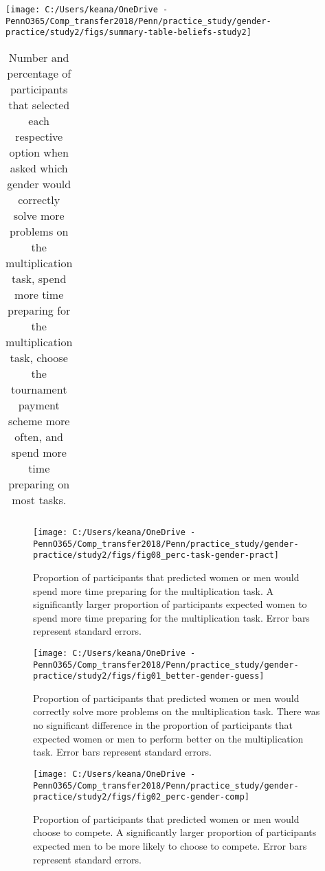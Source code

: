 \documentclass[letterpaper, nobind]{templates/ociamthesis}
\begin{document}
\begin{center}\texttt{[image: C:/Users/keana/OneDrive - PennO365/Comp\_transfer2018/Penn/practice\_study/gender-practice/study2/figs/summary-table-beliefs-study2]} \end{center}

\begin{table}[ht]
\centering
\begingroup\fontsize{0.1pt}{0.1pt}\selectfont
\begin{tabular}{r}
   \\ 
 \end{tabular}
\endgroup
\caption{Number and percentage of participants that selected each respective option when asked which gender would correctly solve more problems on the multiplication task, spend more time preparing for the multiplication task, choose the tournament payment scheme more often, and spend more time preparing on most tasks.} 
\label{tab:summary-table-beliefs-study2}
\end{table}

\begin{figure}

{\centering \texttt{[image: C:/Users/keana/OneDrive - PennO365/Comp\_transfer2018/Penn/practice\_study/gender-practice/study2/figs/fig08\_perc-task-gender-pract]} 

}

\caption{Proportion of participants that predicted women or men would spend more time preparing for the multiplication task. A significantly larger proportion of participants expected women to spend more time preparing for the multiplication task. Error bars represent standard errors.}\label{fig:s203}
\end{figure}

\begin{figure}

{\centering \texttt{[image: C:/Users/keana/OneDrive - PennO365/Comp\_transfer2018/Penn/practice\_study/gender-practice/study2/figs/fig01\_better-gender-guess]} 

}

\caption{Proportion of participants that predicted women or men would correctly solve more problems on the multiplication task. There was no significant difference in the proportion of participants that expected women or men to perform better on the multiplication task. Error bars represent standard errors.}\label{fig:s204}
\end{figure}

\begin{figure}

{\centering \texttt{[image: C:/Users/keana/OneDrive - PennO365/Comp\_transfer2018/Penn/practice\_study/gender-practice/study2/figs/fig02\_perc-gender-comp]} 

}

\caption{Proportion of participants that predicted women or men would choose to compete. A significantly larger proportion of participants expected men to be more likely to choose to compete. Error bars represent standard errors.}\label{fig:s205}
\end{figure}
\end{document}
